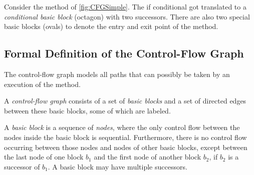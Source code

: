 
Consider the method  of \autoref{fig:CFGSimple}. The if
conditional got translated to a \emph{conditional basic block}
(octagon) with two successors. There are also two special basic blocks
(ovals) to denote the entry and exit point of the method.


\subsection{Formal Definition of the Control-Flow Graph}
\label{sec:cfg-formal}

The control-flow graph models all paths that can possibly be taken by an
execution of the method.

\begin{definition}
    A \emph{control-flow graph} consists of a set of \emph{basic
      blocks} and a set of directed edges between these basic blocks,
    some of which are labeled.
\end{definition}

\begin{definition}
    A \emph{basic block} is a sequence of \emph{nodes}, where the only
    control flow between the nodes inside
    the basic block is sequential.  Furthermore, there is no
    control flow occurring between those nodes and nodes of other basic
    blocks, except between the last node of one block $b_1$ and the first node
    of another block $b_2$, if $b_2$ is a successor of $b_1$.  A basic
    block may have multiple successors.
\end{definition}



